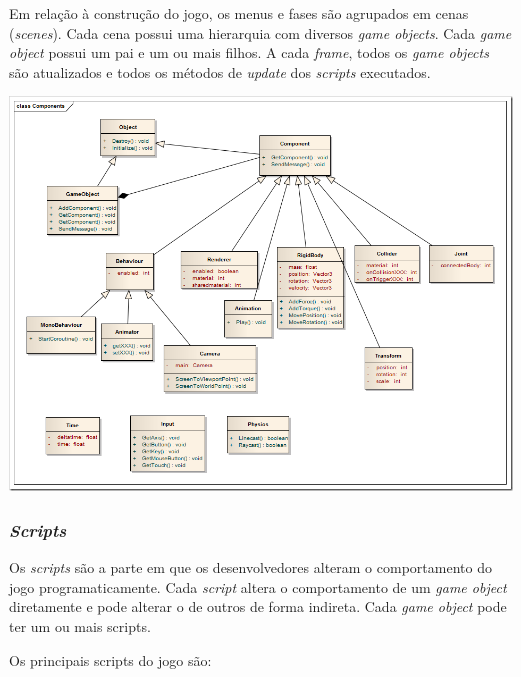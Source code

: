 Em relação à construção do jogo, os menus e fases são agrupados em cenas (\textit{scenes}). Cada cena possui uma hierarquia com diversos \textit{game objects}. Cada \textit{game object} possui um pai e um ou mais filhos. A cada \textit{frame}, todos os \textit{game objects} são atualizados e todos os métodos de \textit{update} dos \textit{scripts} executados.

\begin{center}
	\includegraphics[scale=0.4]{figuras/arquiteturacomponentes}
	\label{figura:arquiteturacomponentes}
\end{center}

\subsubsection{\textit{Scripts}}

Os \textit{scripts} são a parte em que os desenvolvedores alteram o comportamento do jogo programaticamente. Cada \textit{script} altera o comportamento de um \textit{game object} diretamente e pode alterar o de outros de forma indireta. Cada \textit{game object} pode ter um ou mais scripts.

Os principais scripts do jogo são:

